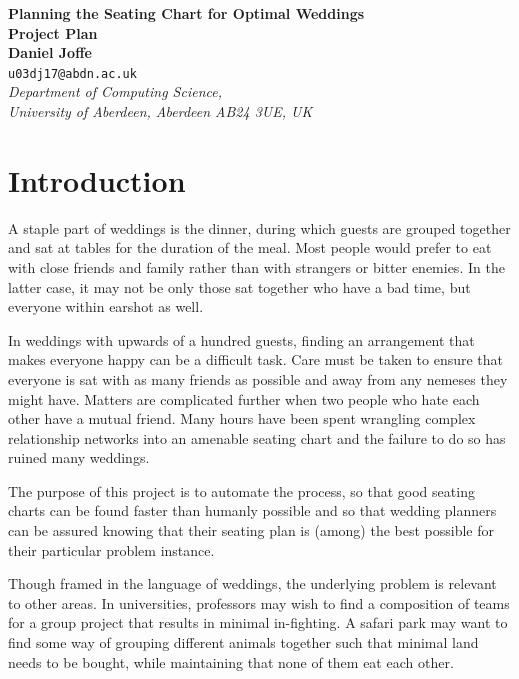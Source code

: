 \documentclass[a4paper,12pt]{article}
\begin{document}
\begin{center}
{\Large\bf{Planning the Seating Chart for Optimal Weddings}} \\
      \vspace{5.0mm}
{\Large\bf{Project Plan}} \\
      \vspace{8mm}
      {\large\bf{Daniel Joffe}}  \\
      \vspace{5.0mm}
       {\tt u03dj17@abdn.ac.uk} \\
      \vspace{5.0mm}
      {\em Department of Computing Science,\\
       University of Aberdeen, Aberdeen AB24 3UE, UK} 
\end{center}


\section*{Introduction}
A staple part of weddings is the dinner, during which guests
are grouped together and sat at tables for the duration of
the meal. Most people would prefer to eat with close friends
and family rather than with strangers or bitter enemies. In
the latter case, it may not be only those sat together who have
a bad time, but everyone within earshot as well.

In weddings with upwards of a hundred guests, finding an
arrangement that makes everyone happy can be a difficult task.
Care must be taken to ensure that everyone is sat with as many
friends as possible and away from any nemeses they might have.
Matters are complicated further when two people who hate each
other have a mutual friend. Many hours have been spent wrangling
complex relationship networks into an amenable seating chart and
the failure to do so has ruined many weddings.

The purpose of this project is to automate the process, so that
good seating charts can be found faster than humanly possible and
so that wedding planners can be assured knowing that their seating
plan is (among) the best possible for their particular problem
instance.

Though framed in the language of weddings, the underlying problem
is relevant to other areas. In universities, professors may wish
to find a composition of teams for a group project that results in
minimal in-fighting. A safari park may want to find some way of
grouping different animals together such that minimal land needs
to be bought, while maintaining that none of them eat each other.
\end{document}
